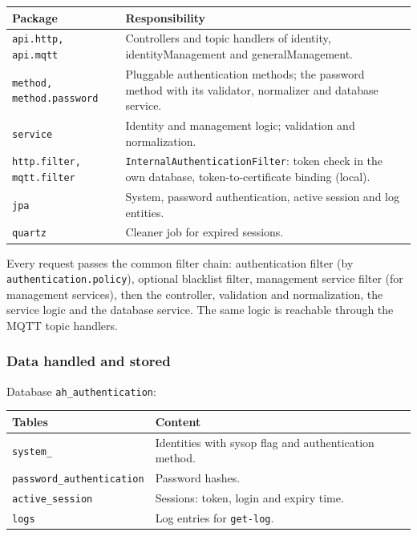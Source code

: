 \documentclass[a4paper]{arrowhead}
\begin{document}
\noindent\begin{longtable}{| p{5.6cm} | p{9.6cm} |} \hline
\rowcolor{gray!33} Package & Responsibility \\ \hline \endhead
\texttt{api.\allowbreak{}http,\allowbreak{} api.\allowbreak{}mqtt} & Controllers and topic handlers of identity, identity\allowbreak{}Management and generalManagement. \\ \hline
\texttt{method,\allowbreak{} method.\allowbreak{}password} & Pluggable authentication methods; the password method with its validator, normalizer and database service. \\ \hline
\texttt{service} & Identity and management logic; validation and normalization. \\ \hline
\texttt{http.\allowbreak{}filter,\allowbreak{} mqtt.\allowbreak{}filter} & \texttt{Internal\allowbreak{}Authentication\allowbreak{}Filter}: token check in the own database, token-to-certificate binding (local). \\ \hline
\texttt{jpa} & System, password authentication, active session and log entities. \\ \hline
\texttt{quartz} & Cleaner job for expired sessions. \\ \hline
\end{longtable}

Every request passes the common filter chain: authentication filter (by \texttt{authentication.policy}), optional blacklist filter, management service filter (for management services), then the controller, validation and normalization, the service logic and the database service. The same logic is reachable through the MQTT topic handlers.

\subsubsection{Data handled and stored}

Database \texttt{ah\_authentication}:

\noindent\begin{longtable}{| p{6.4cm} | p{8.8cm} |} \hline
\rowcolor{gray!33} Tables & Content \\ \hline \endhead
\texttt{system\_\allowbreak{}} & Identities with sysop flag and authentication method. \\ \hline
\texttt{password\_\allowbreak{}authentication} & Password hashes. \\ \hline
\texttt{active\_\allowbreak{}session} & Sessions: token, login and expiry time. \\ \hline
\texttt{logs} & Log entries for \texttt{get-\allowbreak{}log}. \\ \hline
\end{longtable}
\end{document}
